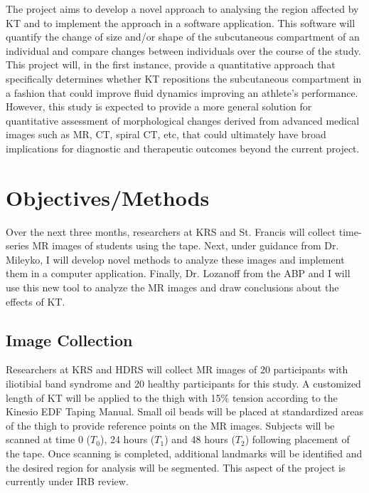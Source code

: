 \documentclass[ letterpaper, 12 pt, conference]{ieeeconf}  %
\begin{document}
The project aims to develop a novel approach to analysing the region affected by \ac{KT} and to implement the approach in a software application.  This software will quantify the change of size and/or shape of the subcutaneous compartment of an individual and compare changes between individuals over the course of the study.
This project will, in the first instance, provide a quantitative approach that specifically determines whether KT repositions the subcutaneous compartment in a fashion that could improve fluid dynamics improving an athlete's performance.  However, this study is expected to provide a more general solution for quantitative assessment of morphological changes derived from advanced medical images such as MR, CT, spiral CT, etc, that could ultimately have broad implications for diagnostic and therapeutic outcomes beyond the current project.  





\section{Objectives/Methods}

Over the next three months, researchers at \ac{KRS} and St. Francis will collect time-series MR images of students using the tape.  Next, under guidance from Dr. Mileyko, I will develop novel methods to analyze these images and implement them in a computer application.  Finally, Dr. Lozanoff from the \ac{ABP} and I will use this new tool to analyze the MR images and draw conclusions about the effects of \ac{KT}.

\subsection{Image Collection}

Researchers at \ac{KRS} and \ac{HDRS} will collect MR images of 20 participants with iliotibial band syndrome and 20 healthy participants for this study.  A customized length of \ac{KT} will be applied to the thigh with 15\% tension according to the Kinesio EDF Taping Manual. Small oil beads will be placed at standardized areas of the thigh to provide reference points on the MR images.  Subjects will be scanned at time 0 ($T_0$), 24 hours ($T_1$) and 48 hours ($T_2$) following placement of the tape. Once scanning is completed, additional landmarks will be identified and the desired region for analysis will be segmented. This aspect of the project is currently under IRB review.
\end{document}

